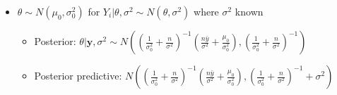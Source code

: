 \documentclass[12pt,a4paper,twocolumn]{article}
\newcommand{\by}{\textbf{y}}
\begin{document}
\begin{sidewaysfigure}
\begin{itemize}
	\item $\theta \sim N(\mu_{0}, \sigma_{0}^2)$ for $Y_{i} | \theta, \sigma^2 \sim N(\theta, \sigma^2)$ where $\sigma^2$ known 
	 	\begin{itemize}
		\item Posterior:  $\theta | \by, \sigma^2 \sim N\left((\frac{1}{\sigma_{0}^2} + \frac{n}{\sigma^2})^{-1} \left(\frac{n\bar{y}}{\sigma^2} + \frac{\mu_{0}}{\sigma_{0}^2} \right), (\frac{1}{\sigma_{0}^2} + \frac{n}{\sigma^2})^{-1}\right)$
		\item Posterior predictive: $N\left((\frac{1}{\sigma_{0}^2} + \frac{n}{\sigma^2})^{-1} \left(\frac{n\bar{y}}{\sigma^2} + \frac{\mu_{0}}{\sigma_{0}^2} \right), (\frac{1}{\sigma_{0}^2} + \frac{n}{\sigma^2})^{-1} + \sigma^2  \right)$
	\end{itemize}
	
\end{itemize}
\end{sidewaysfigure}
\end{document}
